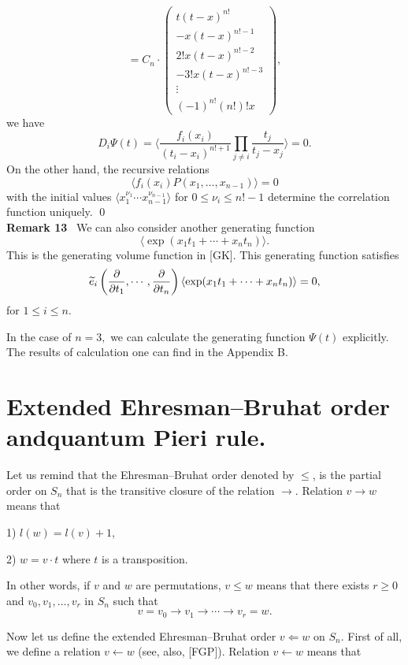 {{\[= C_n \cdot 
\left( \begin{array}{c}
t(t-x)^{n!} \\ -x(t-x)^{n!-1} \\ 2! x(t-x)^{n!-2} 
\\ -3! x(t-x)^{n!-3} \\ \vdots \\ (-1)^{n!}(n!)!x
\end{array} \right) , \] 
we have 
\[ D_i \Psi(t)
= \langle \frac{f_i(x_i)}{(t_i - x_i)^{n!+1}}
\prod_{j \not= i}\frac{t_j}{t_j - x_j} 
 \rangle 
= 0. \] 
On the other hand, the recursive relations 
\[ \langle f_i(x_i) P(x_1,\ldots ,x_{n-1}) 
\rangle = 0 \] 
with the initial values 
$\langle x_1^{\nu_1}\cdots x_{n-1}^{\nu_{n-1}} \rangle $ 
for $0\leq \nu_i \leq n!-1$ 
determine the correlation function uniquely. \qed
\smallskip \\ 
{\bf Remark 13} \ We can also consider another generating 
function 
\[ \langle \exp(x_1 t_1 + \cdots + x_n t_n) \rangle .\] 
This is the generating volume function in [GK]. This 
generating function satisfies 
\[ {\widetilde e}_i \left( \frac{\partial}{\partial t_1},\cdots , 
\frac{\partial}{\partial t_n}\right) 
\langle \exp (x_1 t_1 + \cdots + x_n t_n) \rangle 
= 0, \] 
for $1\leq i \leq n.$ \bigskip 
 
In the case of $n=3,$ we can calculate the generating 
function $\Psi (t)$ explicitly. The results of calculation one can find
in the Appendix B.

\section{Extended Ehresman--Bruhat order and\break quantum Pieri rule.}

Let us remind that the Ehresman--Bruhat order denoted by $\le$, 
is the partial order on $S_n$ 
that is the transitive closure of the relation $\rightarrow$. Relation 
$v\to w$ means that

1) $l(w)=l(v)+1$,

2) $w=v\cdot t$ where $t$ is a transposition.

In other words, if $v$ and $w$ are permutations, $v\le w$ means that 
there exists $r\ge 0$ and $v_0,v_1,\ldots ,v_r$ in $S_n$ such that
$$v=v_0\to v_1\to\cdots\to v_r=w.
$$

Now let us define the extended Ehresman--Bruhat order $v\Leftarrow w$ on 
$S_n$. First of all, we define a relation $v\leftarrow w$ (see, also, [FGP]). 
Relation $v\leftarrow w$ means that

}}
